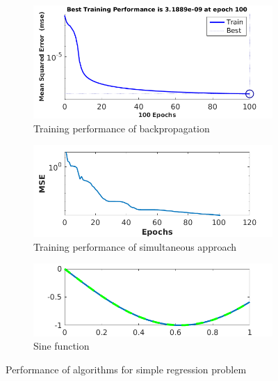\begin{figure}
     \centering
     \begin{subfigure}[b]{0.8\textwidth}
         \centering
         \includegraphics[width=\textwidth]{back_test_1}
         \caption{Training performance of backpropagation}
         \label{fig:y equals x}
     \end{subfigure}
     \begin{subfigure}[b]{0.8\textwidth}
         \centering
         \includegraphics[width=\textwidth]{back_test_12}
         \caption{Training performance of simultaneous approach}
     \end{subfigure}
     \begin{subfigure}[b]{0.8\textwidth}
         \centering
         \includegraphics[width=\textwidth]{sine}
         \caption{Sine function}
     \end{subfigure}
        \caption{Performance of algorithms for simple regression problem}
        \label{fig:three graphs}
\end{figure}




